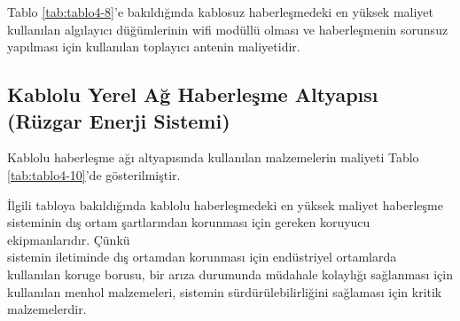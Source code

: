 Tablo \ref{tab:tablo4-8}’e bakıldığında kablosuz haberleşmedeki en yüksek maliyet kullanılan algılayıcı düğümlerinin \gls{wifi} modüllü olması ve haberleşmenin sorunsuz yapılması için kullanılan toplayıcı antenin maliyetidir. 


\subsection{Kablolu Yerel Ağ Haberleşme Altyapısı (Rüzgar Enerji Sistemi)}


Kablolu haberleşme ağı altyapısında kullanılan malzemelerin maliyeti Tablo \ref{tab:tablo4-10}’de gösterilmiştir.

İlgili tabloya bakıldığında kablolu haberleşmedeki en yüksek maliyet haberleşme sisteminin dış ortam şartlarından korunması için gereken koruyucu ekipmanlarıdır. Çünkü\\ sistemin iletiminde dış ortamdan korunması için endüstriyel ortamlarda kullanılan koruge borusu, bir arıza durumunda müdahale kolaylığı sağlanması için kullanılan menhol malzemeleri, sistemin sürdürülebilirliğini sağlaması için kritik malzemelerdir.


